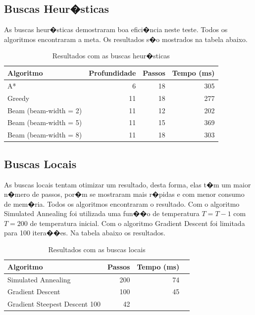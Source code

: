 \documentclass[12pt]{article}
\begin{document}
\subsection{Buscas Heur�sticas}

As buscas heur�sticas demostraram boa efici�ncia neste teste. Todos os algoritmos encontraram a meta. Os resultados s�o mostrados na tabela abaixo.

\begin{table}[!th]
 \begin{center}
  \caption{Resultados com as buscas heur�sticas}
  \begin{tabular}{|l|r|r|r|}
    \hline
        Algoritmo 						& Profundidade  	& Passos		& Tempo (ms) 	\\ \hline
        A*	 							& 6 	  			& 18 			& 305			\\ \hline
        Greedy							& 11 				& 18			& 277			\\ \hline
		Beam (beam-width = 2)			& 11 				& 12			& 202			\\ \hline
		Beam (beam-width = 5)			& 11 				& 15			& 369			\\ \hline
		Beam (beam-width = 8)			& 11 				& 18			& 303			\\ \hline
  \end{tabular}
  \label{table:tabela1}
 \end{center}
\end{table}

\subsection{Buscas Locais}

As buscas locais tentam otimizar um resultado, desta forma, elas t�m um maior n�mero de passos, por�m se mostraram mais r�pidas e com menor consumo de mem�ria. Todos os algoritmos encontraram o resultado. Com o algoritmo Simulated Annealing foi utilizada uma fun��o de temperatura $T = T - 1$ com $T = 200$ de temperatura inicial. Com o algoritmo Gradient Descent foi limitada para 100 itera��es. Na tabela abaixo os resultados.

\begin{table}[!th]
 \begin{center}
  \caption{Resultados com as buscas locais}
  \begin{tabular}{|l|r|r|r|}
    \hline
        Algoritmo & Passos		& Tempo (ms) 	\\ \hline
        Simulated Annealing	& 200 	  		& 74			\\ \hline
        Gradient Descent		& 100 	  		& 45			\\ \hline
        Gradient Steepest Descent	 100 	  		& 42			\\ \hline
  \end{tabular}
  \label{table:tabela1}
 \end{center}
\end{table}
\end{document}
